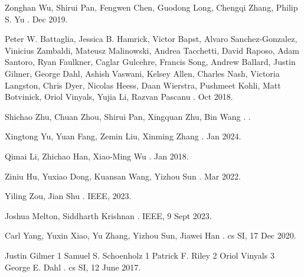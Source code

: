 \documentclass{report} %
\begin{document}
\begin{thebibliography}{00}
    \newblock Zonghan Wu, Shirui Pan, Fengwen Chen, Guodong Long, Chengqi Zhang, Philip S. Yu
    .
     Dec 2019.

    \newblock Peter W. Battaglia, Jessica B. Hamrick, Victor Bapst, Alvaro Sanchez-Gonzalez, Vinicius Zambaldi, Mateusz Malinowski, Andrea Tacchetti, David Raposo, 
    Adam Santoro, Ryan Faulkner, Caglar Gulcehre, Francis Song, Andrew Ballard, Justin Gilmer, George Dahl, Ashish Vaswani, Kelsey Allen, Charles Nash,
    Victoria Langston, Chris Dyer, Nicolas Heess, Daan Wierstra, Pushmeet Kohli, Matt Botvinick, Oriol Vinyals, Yujia Li, Razvan Pascanu
    .
     Oct 2018.

    \newblock Shichao Zhu, Chuan Zhou, Shirui Pan, Xingquan Zhu, Bin Wang
    .
    .

    \newblock Xingtong Yu, Yuan Fang, Zemin Liu, Xinming Zhang
    .
     Jan 2024.

    \newblock Qimai Li, Zhichao Han, Xiao-Ming Wu
    .
     Jan 2018.

    \newblock Ziniu Hu, Yuxiao Dong, Kuansan Wang, Yizhou Sun
    .
     Mar 2022.

    \newblock Yiling Zou, Jian Shu
    .
    \newblock IEEE, 2023.

    \newblock Joshua Melton, Siddharth Krishnan
    .
    \newblock IEEE, 9 Sept 2023.

    \newblock Carl Yang, Yuxin Xiao, Yu Zhang, Yizhou Sun, Jiawei Han
    .
    \newblock cs SI, 17 Dec 2020.

    \newblock Justin Gilmer 1 Samuel S. Schoenholz 1 Patrick F. Riley 2 Oriol Vinyals 3 George E. Dahl
    .
    \newblock cs SI, 12 June 2017.

    \end{thebibliography}
\newpage 
\end{document}
